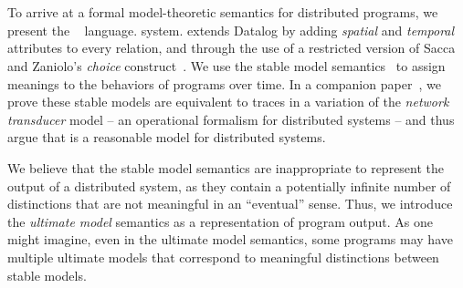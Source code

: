 \section{\large \bf \lang}
\label{sec:foundation}

To arrive at a formal model-theoretic semantics for distributed programs, we present the
\lang~\cite{dedalus} language.
system.  %
\lang extends Datalog by adding {\em spatial} and {\em temporal} attributes to every relation, and through the use of a restricted version of Sacca and Zaniolo's {\em choice} construct~\cite{sacca-zaniolo}.  We use the stable model semantics~\cite{stable-model} to assign meanings to the behaviors of \lang programs over time.  
In a companion paper~\cite{ameloot-operational}, we prove these stable models are equivalent to traces in a variation of the {\em network transducer} model -- an operational formalism for distributed systems -- and thus argue that \lang is a reasonable model for distributed systems.

We believe that the stable model semantics are inappropriate to represent the output of a distributed system, as they contain a potentially infinite number of distinctions that are not meaningful in an ``eventual'' sense.  Thus, we introduce the {\em ultimate model} semantics as a representation of program output.  As one might imagine, even in the ultimate model semantics, some programs may have multiple ultimate models that correspond to meaningful distinctions between stable models.


